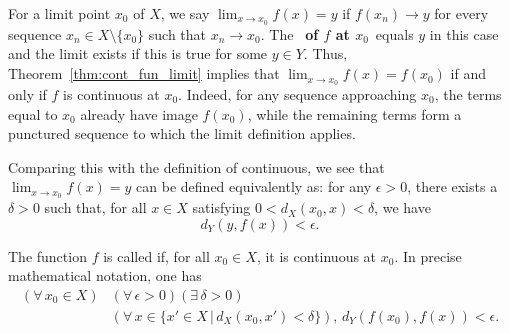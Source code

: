 \begin{definition} \label{def:cont_limit}
For a limit point $x_0$ of $X$, we say $\lim_{x\to x_0}f(x)=y$ if $f(x_n)\to y$ for every sequence $x_n \in X \setminus\{x_0\}$ such that $x_n\to x_0$.
The \boldmath%
~\textbf{of $f$ at $x_0$}\unboldmath~equals $y$ in this case and the limit exists if this is true for some $y\in Y$.
Thus, Theorem~\ref{thm:cont_fun_limit} implies that $\lim_{x\to x_0} f(x)=f(x_0)$ if and only if $f$ is continuous at $x_0$.
Indeed, for any sequence approaching $x_0$, the terms equal to $x_0$ already have image $f(x_0)$, while the remaining terms form a punctured sequence to which the limit definition applies.
\end{definition}


\begin{remark}
Comparing this with the definition of continuous, we see that $\lim_{x\to x_0} f(x)=y$ can be defined equivalently as:
for any $\epsilon> 0$, there exists a $\delta >0$ such that, for all $x\in X$ satisfying $0 < d_X(x_0,x) < \delta$, we have
\[ d_Y \left( y,f(x) \right) < \epsilon .\]
\end{remark}



\begin{definition}
The function $f$ is called  if, for all $x_0 \in X$, it is continuous at $x_0$.
In precise mathematical notation, one has
\begin{equation*}
\begin{split}
(\forall \, x_0 \in X) & (\forall \, \epsilon >0) ( \exists \, \delta >0) \\ & (\forall \, x \in \{x'\in X\,|\,d_X (x_0,x')<\delta\}), \,
  d_Y \left( f(x_0),f(x) \right) < \epsilon .
\end{split}
\end{equation*}
\end{definition}

